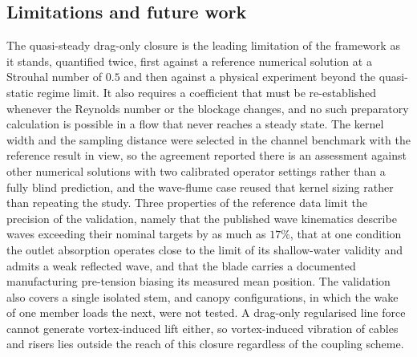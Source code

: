 \subsection{Limitations and future work}
\label{sec:limitations}

\noindent
The quasi-steady drag-only closure is the leading limitation of the framework as it stands, quantified twice, first against a reference numerical solution at a Strouhal number of $0.5$ and then against a physical experiment beyond the quasi-static regime limit. It also requires a coefficient that must be re-established whenever the Reynolds number or the blockage changes, and no such preparatory calculation is possible in a flow that never reaches a steady state. The kernel width and the sampling distance were selected in the channel benchmark with the reference result in view, so the agreement reported there is an assessment against other numerical solutions with two calibrated operator settings rather than a fully blind prediction, and the wave-flume case reused that kernel sizing rather than repeating the study. Three properties of the reference data limit the precision of the validation, namely that the published wave kinematics describe waves exceeding their nominal targets by as much as $17\%$, that at one condition the outlet absorption operates close to the limit of its shallow-water validity and admits a weak reflected wave, and that the blade carries a documented manufacturing pre-tension biasing its measured mean position. The validation also covers a single isolated stem, and canopy configurations, in which the wake of one member loads the next, were not tested. A drag-only regularised line force cannot generate vortex-induced lift either, so vortex-induced vibration of cables and risers lies outside the reach of this closure regardless of the coupling scheme.

